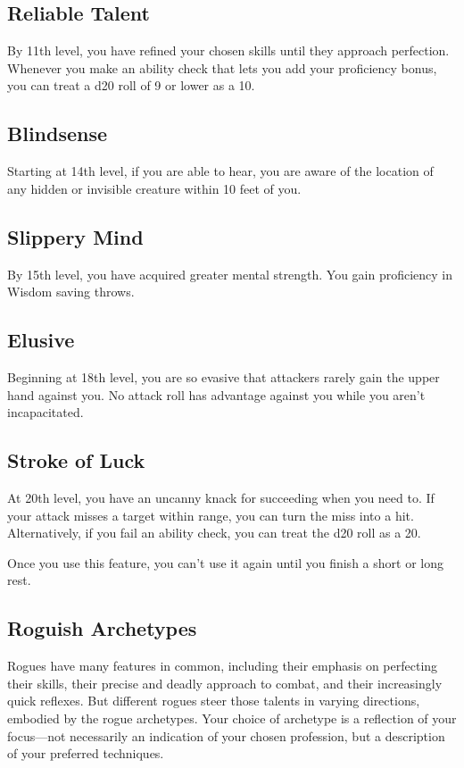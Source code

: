 \subsection{Reliable Talent}

By 11th level, you have refined your chosen skills until they approach perfection. Whenever you make an ability check that lets you add your proficiency bonus, you can treat a d20 roll of 9 or lower as a 10.

\subsection{Blindsense}

Starting at 14th level, if you are able to hear, you are aware of the location of any hidden or invisible creature within 10 feet of you.

\subsection{Slippery Mind}

By 15th level, you have acquired greater mental strength. You gain proficiency in Wisdom saving throws.

\subsection{Elusive}

Beginning at 18th level, you are so evasive that attackers rarely gain the upper hand against you. No attack roll has advantage against you while you aren’t incapacitated.

\subsection{Stroke of Luck}

At 20th level, you have an uncanny knack for succeeding when you need to. If your attack misses a target within range, you can turn the miss into a hit. Alternatively, if you fail an ability check, you can treat the d20 roll as a 20.

Once you use this feature, you can’t use it again until you finish a short or long rest.

\subsection{Roguish Archetypes}

Rogues have many features in common, including their emphasis on perfecting their skills, their precise and deadly approach to combat, and their increasingly quick reflexes. But different rogues steer those talents in varying directions, embodied by the rogue archetypes. Your choice of archetype is a reflection of your focus—not necessarily an indication of your chosen profession, but a description of your preferred techniques.

